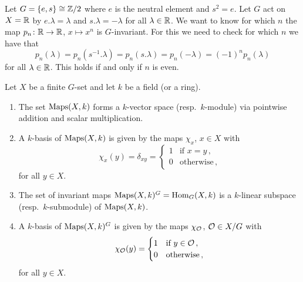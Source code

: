 \begin{example}
  Let $G = \{e,s\} \cong \mathbb{Z}/2$ where $e$ is the neutral element and $s^2 = e$.
  Let $G$ act on $X = \mathbb{R}$ by $e.\lambda = \lambda$ and $s.\lambda = -\lambda$ for all $\lambda \in \mathbb{R}$.
  We want to know for which $n$ the map $p_n \colon \mathbb{R} \to \mathbb{R}$, $x \mapsto x^n$ is $G$-invariant.
  For this we need to check for which $n$ we have that
  \[
      p_n(\lambda)
    = p_n\left( s^{-1}.\lambda \right)
    = p_n(s.\lambda)
    = p_n(-\lambda)
    = (-1)^n p_n(\lambda)
  \]
  for all $\lambda \in \mathbb{R}$.
  This holds if and only if $n$ is even.
\end{example}


\begin{lemma}\label{lemma: basis of Maps and Hom}
  Let $X$ be a finite $G$-set and let $k$ be a field (or a ring).
  \begin{enumerate}[label=\alph*)]
    \item
      The set $\operatorname{Maps}(X,k)$ forms a $k$-vector space (resp.\ $k$-module) via pointwise addition and scalar multiplication.
    \item
      A $k$-basis of $\operatorname{Maps}(X,k)$ is given by the maps $\chi_x$, $x \in X$ with
      \[
          \chi_x(y)
        = \delta_{xy}
        = \begin{cases}
            1 & \text{if $x = y$} \,, \\
            0 & \text{otherwise}  \,,
          \end{cases}
      \]
      for all $y \in X$.
    \item
      The set of invariant maps $\operatorname{Maps}(X,k)^G = \operatorname{Hom}_G(X,k)$ is a $k$-linear subspace (resp.\ $k$-submodule) of $\operatorname{Maps}(X,k)$.
    \item
      A $k$-basis of $\operatorname{Maps}(X,k)^G$ is given by the maps $\chi_\mathcal{O}$, $\mathcal{O} \in X/G$ with
      \[
          \chi_\mathcal{O}(y)
        = \begin{cases}
            1 & \text{if $y \in \mathcal{O}$} \,,  \\
            0 & \text{otherwise} \,,
          \end{cases}
      \]
      for all $y \in X$.
  \end{enumerate}
\end{lemma}


